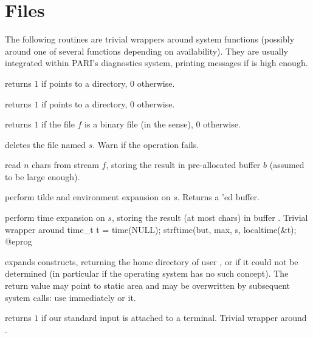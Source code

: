 

\section{Files}

The following routines are trivial wrappers around system functions
(possibly around one of several functions depending on availability).
They are usually integrated within PARI's diagnostics system, printing
messages if  is high enough.

 returns $1$ if  points to
a directory, $0$ otherwise.

 returns $1$ if  points to
a directory, $0$ otherwise.

 returns $1$ if the file $f$ is a binary
file (in the  sense), $0$ otherwise.

 deletes the file named $s$. Warn
if the operation fails.

 read $n$ chars from
stream $f$, storing the result in pre-allocated buffer $b$ (assumed to be
large enough).

 perform tilde and environment expansion
on $s$. Returns a 'ed buffer.

 perform
time expansion on $s$, storing the result (at most  chars) in
buffer . Trivial wrapper around
\bprog
  time_t t = time(NULL);
  strftime(but, max, s, localtime(&t);
@eprog

 expands 
constructs, returning the home directory of user , or  if
it could not be determined (in particular if the operating system has no such
concept). The return value may point to static area and may be overwritten
by subsequent system calls: use immediately or  it.

 returns $1$ if our standard input
 is attached to a terminal. Trivial wrapper around .


